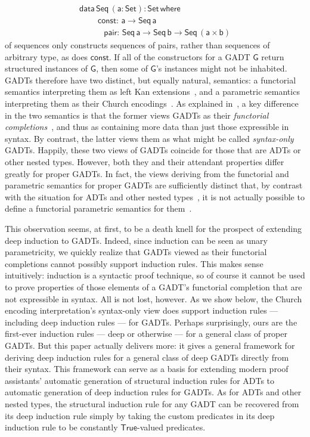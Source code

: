 \documentclass[9pt]{entcs}
\begin{document}
\begin{equation}\label{eq:seq}
\begin{array}{l}
\mathsf{data\, Seq\,(a : Set) : Set\,where}\\
\mathsf{\;\;\;\;\;\;\;\;const :\, a \to Seq\,a}\\
\mathsf{\;\;\;\;\;\;\;\;\;\;\,pair :\, Seq \,a \to Seq\,b \to
  Seq\,(a \times b)}
\end{array}
\end{equation}
\noindent
of sequences only constructs sequences of pairs, rather than sequences
of arbitrary type, as does $\mathsf{const}$. If all of the
constructors for a GADT $\mathsf{G}$ return structured instances of
$\mathsf{G}$, then some of $\mathsf{G}$'s instances might not be
inhabited. GADTs therefore have two distinct, but equally natural,
semantics: a functorial semantics interpreting them as left Kan
extensions~\cite{mac71}, and a parametric semantics interpreting them
as their Church encodings~\cite{atk12,vw10}. As explained
in~\cite{jgj21}, a key difference in the two semantics is that the
former views GADTs as their {\em functorial completions}~\cite{jp19},
and thus as containing more data than just those expressible in
syntax. By contrast, the latter views them as what might be called
{\em syntax-only} GADTs. Happily, these two views of GADTs coincide
for those that are ADTs or other nested types. However, both they and
their attendant properties differ greatly for proper GADTs. In fact,
the views deriving from the functorial and parametric semantics for
proper GADTs are sufficiently distinct that, by contrast with the
situation for ADTs and other nested
types~\cite{bfss90,gjfor15,jgj21f}, it is not actually possible to
define a functorial parametric semantics for them~\cite{jgj21}.

This observation seems, at first, to be a death knell for the prospect
of extending deep induction to GADTs. Indeed, since induction can be
seen as unary parametricity, we quickly realize that GADTs viewed as
their functorial completions cannot possibly support induction rules.
This makes sense intuitively: induction is a syntactic proof
technique, so of course it cannot be used to prove properties of those
elements of a GADT's functorial completion that are not expressible in
syntax. All is not lost, however. As we show below, the Church
encoding interpretation's syntax-only view does support induction
rules --- including deep induction rules --- for GADTs. Perhaps
surprisingly, ours are the first-ever induction rules --- deep or
otherwise --- for a general class of proper GADTs. But this paper
actually delivers more: it gives a general framework for deriving deep
induction rules for a general class of deep GADTs directly from their
syntax. This framework can serve as a basis for extending modern proof
assistants' automatic generation of structural induction rules for
ADTs to automatic generation of deep induction rules for GADTs. As for
ADTs and other nested types, the structural induction rule for any
GADT can be recovered from its deep induction rule simply by taking
the custom predicates in its deep induction rule to be constantly
$\mathsf{True}$-valued predicates.
\end{document}
